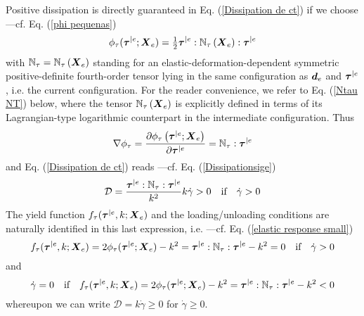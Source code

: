 \documentclass[preprint,review,12pt,sort&compress]{elsarticle}%
\renewcommand{\mathbf}[1]{\mbox{\boldmath $#1$ \unboldmath}  \!\!}
\begin{document}
Positive dissipation is directly guaranteed in Eq. (\ref{Dissipation de ct})
if we choose---cf. Eq. (\ref{phi pequenas})%
\begin{equation}
\phi_{\tau}(\mathbf{\tau}^{|e};\mathbf{X}_{e})=\tfrac{1}{2}\mathbf{\tau}%
^{|e}:\mathbb{N}_{\tau}\left(  \mathbf{X}_{e}\right)  :\mathbf{\tau}^{|e}
\label{potential taue Xe}%
\end{equation}
with $\mathbb{N}_{\tau}=\mathbb{N}_{\tau}\left(  \mathbf{X}_{e}\right)  $
standing for an elastic-deformation-dependent symmetric positive-definite
fourth-order tensor lying in the same configuration as $\mathbf{d}_{e}$ and
$\mathbf{\tau}^{|e}$, i.e. the current configuration. For the reader
convenience, we refer to Eq. (\ref{Ntau NT}) below, where the tensor
$\mathbb{N}_{\tau}\left(  \mathbf{X}_{e}\right)  $ is explicitly defined in
terms of its Lagrangian-type logarithmic counterpart in the intermediate
configuration. Thus%
\begin{equation}
\nabla\phi_{\tau}=\frac{\partial\phi_{\tau}\left(  \mathbf{\tau}%
^{|e};\mathbf{X}_{e}\right)  }{\partial\mathbf{\tau}^{|e}}=\mathbb{N}_{\tau
}:\mathbf{\tau}^{|e}%
\end{equation}
and Eq. (\ref{Dissipation de ct}) reads ---cf. Eq. (\ref{Dissipationsige})%
\begin{equation}
\mathcal{D}=\frac{\mathbf{\tau}^{|e}:\mathbb{N}_{\tau}:\mathbf{\tau}^{|e}%
}{k^{2}}k\dot{\gamma}>0\quad\text{if}\quad\dot{\gamma}>0 \label{Diss eq}%
\end{equation}
The yield function $f_{\tau}(\mathbf{\tau}^{|e},k;\mathbf{X}_{e})$ and the
loading/unloading conditions are naturally identified in this last expression,
i.e. ---cf. Eq. (\ref{elastic response small})%
\begin{equation}
f_{\tau}(\mathbf{\tau}^{|e},k;\mathbf{X}_{e})=2\phi_{\tau}(\mathbf{\tau}%
^{|e};\mathbf{X}_{e})-k^{2}=\mathbf{\tau}^{|e}:\mathbb{N}_{\tau}:\mathbf{\tau
}^{|e}-k^{2}=0\quad\text{if}\quad\dot{\gamma}>0 \label{Yield fcn spatial}%
\end{equation}
and%
\begin{equation}
\dot{\gamma}=0\quad\text{if}\quad f_{\tau}(\mathbf{\tau}^{|e},k;\mathbf{X}%
_{e})=2\phi_{\tau}(\mathbf{\tau}^{|e};\mathbf{X}_{e})-k^{2}=\mathbf{\tau}%
^{|e}:\mathbb{N}_{\tau}:\mathbf{\tau}^{|e}-k^{2}<0
\end{equation}
whereupon we can write $\mathcal{D}=k\dot{\gamma}\geq0$ for $\dot{\gamma}%
\geq0$.
\end{document}
